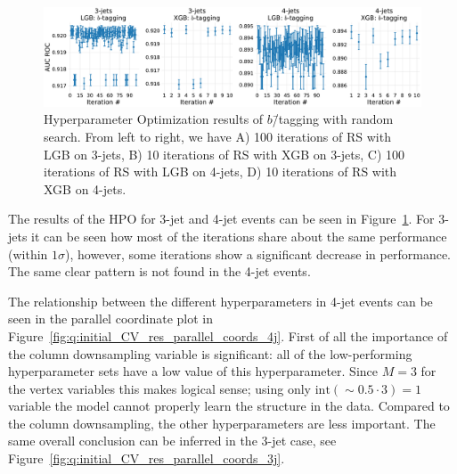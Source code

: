 \begin{figure}%
  \centerfloat
  \includegraphics[width=\textwidth, trim=0 0 0 0, clip]{figures/quarks/cv_res_lgb-btag-down_sample=1.00-ML_vars=vertex-selection=b-ejet_min=4-n_iter_RS_lgb=99-n_iter_RS_xgb=9-cdot_cut=0.90-version=19.pdf}
  \vspace{3mm}
  \caption[Hyperparameter Optimization of $b$\=/Tagging]{
    Hyperparameter Optimization results of $b$\=/tagging with random search. From left to right, we have A) \num{100} iterations of RS with LGB on 3-jets, B) \num{10} iterations of RS with XGB on 3-jets, C) \num{100} iterations of RS with LGB on 4-jets, D) \num{10} iterations of RS with XGB on 4-jets. }
  \label{fig:q:CV_res_iterations_b_tagging}%
\end{figure}
\vspace{-3mm}

The results of the HPO for 3-jet and 4-jet events can be seen in Figure~\ref{fig:q:CV_res_iterations_b_tagging}. For 3-jets it can be seen how most of the iterations share about the same performance (within $1\sigma$), however, some iterations show a significant decrease in performance. The same clear pattern is not found in the 4-jet events.

The relationship between the different hyperparameters in 4-jet events can be seen in the parallel coordinate plot in Figure~\ref{fig:q:initial_CV_res_parallel_coords_4j}. First of all the importance of the column downsampling  variable is significant: all of the low-performing hyperparameter sets have a low value of this hyperparameter. Since $M=3$ for the vertex variables this makes logical sense; using only $\mathrm{int}(\sim 0.5 \cdot 3) = 1$ variable the model cannot properly learn the structure in the data. Compared to the column downsampling, the other hyperparameters are less important. The same overall conclusion can be inferred in the 3-jet case, see Figure~\ref{fig:q:initial_CV_res_parallel_coords_3j}.

